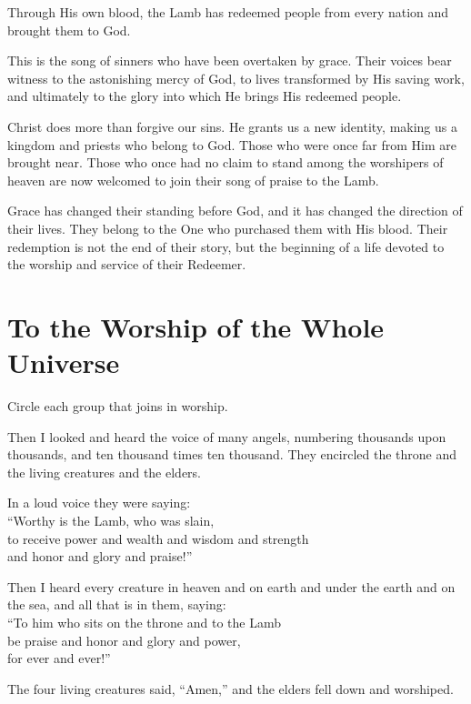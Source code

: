 Through His own blood, the Lamb has redeemed people from every nation and brought them to God.

This is the song of sinners who have been overtaken by grace. Their voices bear witness to the astonishing mercy of God, to lives transformed by His saving work, and ultimately to the glory into which He brings His redeemed people.

Christ does more than forgive our sins. He grants us a new identity, making us a kingdom and priests who belong to God. Those who were once far from Him are brought near. Those who once had no claim to stand among the worshipers of heaven are now welcomed to join their song of praise to the Lamb.

Grace has changed their standing before God, and it has changed the direction of their lives. They belong to the One who purchased them with His blood. Their redemption is not the end of their story, but the beginning of a life devoted to the worship and service of their Redeemer.

\section{To the Worship of the Whole Universe}

\begin{ScriptureBox2}{Circle each group that joins in worship.}

\item[5:11] Then I looked and heard the voice of many angels, numbering thousands upon thousands, and ten thousand times ten thousand. They encircled the throne and the living creatures and the elders.

\item[5:12] In a loud voice they were saying:\\
\hspace*{1.5em}``Worthy is the Lamb, who was slain,\\
\hspace*{1.5em}to receive power and wealth and wisdom and strength\\
\hspace*{1.5em}and honor and glory and praise!''

\item[5:13] Then I heard every creature in heaven and on earth and under the earth and on the sea, and all that is in them, saying:\\
\hspace*{1.5em}``To him who sits on the throne and to the Lamb\\
\hspace*{1.5em}be praise and honor and glory and power,\\
\hspace*{1.5em}for ever and ever!''

\item[5:14] The four living creatures said, ``Amen,'' and the elders fell down and worshiped.

\end{ScriptureBox2}



